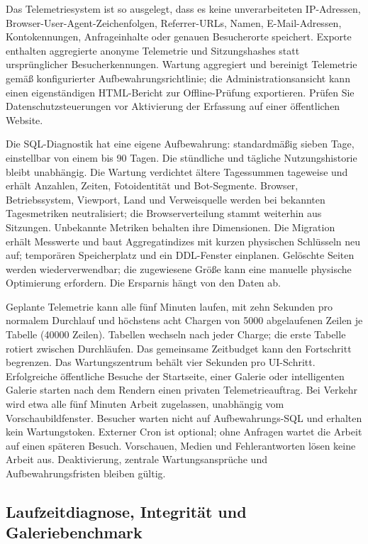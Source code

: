 \documentclass[11pt,a4paper]{article}
\begin{document}
Das Telemetriesystem ist so ausgelegt, dass es keine unverarbeiteten
IP-Adressen, Browser-User-Agent-Zeichenfolgen, Referrer-URLs, Namen,
E-Mail-Adressen, Kontokennungen, Anfrageinhalte oder genauen Besucherorte
speichert. Exporte enthalten aggregierte anonyme Telemetrie und Sitzungshashes
statt ursprünglicher Besucherkennungen. Wartung aggregiert und bereinigt
Telemetrie gemäß konfigurierter Aufbewahrungsrichtlinie; die
Administrationsansicht kann einen eigenständigen HTML-Bericht zur
Offline-Prüfung exportieren. Prüfen Sie Datenschutzsteuerungen vor Aktivierung
der Erfassung auf einer öffentlichen Website.

Die SQL-Diagnostik hat eine eigene Aufbewahrung: standardmäßig sieben Tage,
einstellbar von einem bis 90 Tagen. Die stündliche und tägliche Nutzungshistorie
bleibt unabhängig. Die Wartung verdichtet ältere Tagessummen tageweise und
erhält
Anzahlen, Zeiten, Fotoidentität und Bot-Segmente. Browser, Betriebssystem,
Viewport, Land und Verweisquelle werden bei bekannten Tagesmetriken
neutralisiert;
die Browserverteilung stammt weiterhin aus Sitzungen. Unbekannte Metriken
behalten
ihre Dimensionen. Die Migration erhält Messwerte und baut Aggregatindizes mit
kurzen physischen Schlüsseln neu auf; temporären Speicherplatz und ein
DDL-Fenster
einplanen. Gelöschte Seiten werden wiederverwendbar; die zugewiesene Größe kann
eine manuelle physische Optimierung erfordern. Die Ersparnis hängt von den Daten
ab.

Geplante Telemetrie kann alle fünf Minuten laufen, mit zehn Sekunden pro
normalem Durchlauf und höchstens acht Chargen von 5000 abgelaufenen Zeilen je
Tabelle (40000 Zeilen). Tabellen wechseln nach jeder Charge; die erste Tabelle
rotiert zwischen Durchläufen. Das gemeinsame Zeitbudget kann den Fortschritt
begrenzen. Das Wartungszentrum behält vier Sekunden pro UI-Schritt. Erfolgreiche
öffentliche Besuche der Startseite, einer Galerie oder intelligenten
Galerie starten nach dem Rendern einen privaten Telemetrieauftrag. Bei Verkehr
wird etwa alle fünf Minuten Arbeit zugelassen, unabhängig vom
Vorschaubildfenster.
Besucher warten nicht auf Aufbewahrungs-SQL und erhalten kein Wartungstoken.
Externer Cron ist optional; ohne Anfragen wartet die Arbeit auf einen späteren
Besuch. Vorschauen, Medien und Fehlerantworten lösen keine Arbeit aus.
Deaktivierung, zentrale Wartungsansprüche und Aufbewahrungsfristen bleiben
gültig.

\subsection{Laufzeitdiagnose, Integrität und Galeriebenchmark}
\end{document}
